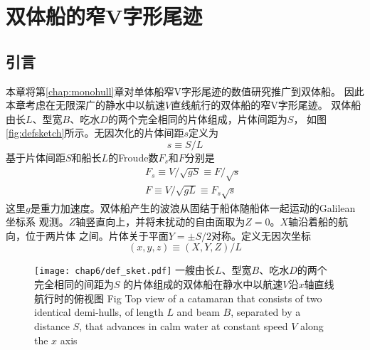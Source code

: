 \chapter{双体船的窄V字形尾迹}
\label{chap:catamaran}

\section{引言}
本章将第\ref{chap:monohull}章对单体船窄V字形尾迹的数值研究推广到双体船。
因此本章考虑在无限深广的静水中以航速$V$直线航行的双体船的窄V字形尾迹。
双体船由长$L$、型宽$B$、吃水$D$的两个完全相同的片体组成，片体间距为$S$，
如图\ref{fig:defsketch}所示。无因次化的片体间距$s$定义为
\begin{equation}
  s\equiv S/L
  \label{eq:sdef}
\end{equation}
基于片体间距$S$和船长$L$的Froude数$F_s$和$F$分别是
\begin{subequations}\label{eq:FFsdef}
  \begin{eqnarray}
    &&F_s\equiv V/\sqrt{gS}\equiv F/\sqrt{s}\label{eq:FFsdef-a}\\
    &&F\equiv V/\sqrt{gL}\equiv F_s\sqrt{s}\label{eq:FFsdef-b}
  \end{eqnarray}
\end{subequations}
这里$g$是重力加速度。双体船产生的波浪从固结于船体随船体一起运动的Galilean坐标系
观测。$Z$轴竖直向上，并将未扰动的自由面取为$Z=0$。$X$轴沿着船的航向，位于两片体
之间。片体关于平面$Y=\pm S/2$对称。定义无因次坐标
\begin{equation}
  (x,y,z)\equiv(X,Y,Z)/L
  \label{eq:xyz}
\end{equation}
%
\begin{figure}[htp]
  \centering
  \captionstyle{\centering}
  \texttt{[image: chap6/def\_sket.pdf]}
  {一艘由长$L$、型宽$B$、吃水$D$的两个完全相同的间距为$S$
  的片体组成的双体船在静水中以航速$V$沿$x$轴直线航行时的俯视图}
  {Fig}
  {Top view of a catamaran that consists of two identical demi-hulls, 
    of length $L$ and beam $B$, separated by a distance $S$, 
    that advances in calm water at constant speed $V$ along the $x$ axis}
\end{figure}
%

